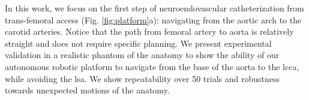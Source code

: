 In this work, we focus on the first step of neuroendovascular catheterization from trans-femoral access (Fig. \ref{fig:platform}a): navigating from the aortic arch to the carotid arteries. Notice that the path from femoral artery to aorta is relatively straight and does not require specific planning. We present experimental validation in a realistic phantom of the anatomy to show the ability of our autonomous robotic platform to navigate from the base of the aorta to the \gls{lcca}, while avoiding the \gls{lsa}. We show repeatability over 50 trials and robustness towards unexpected motions of the anatomy.


